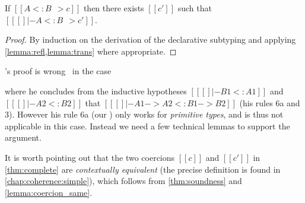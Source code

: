 \begin{theorem} \label{thm:complete}
  If $[[A <: B ~~> c]]$ then there exists $[[c']]$ such that $[[ [] |- A <: B ~~> c']]$.
\end{theorem}
\begin{proof}
  By induction on the derivation of the declarative subtyping and applying \cref{lemma:refl,lemma:trans} where appropriate.
\end{proof}
\begin{remark}
  \citeauthor{pierce1989decision}'s proof is wrong~\cite[pp.~20, Case~F]{pierce1989decision} in the case
  \begin{mathpar}
  \end{mathpar}
  where he concludes from the inductive
  hypotheses $[[ [] |- B1 <: A1]]$ and $[[ [] |- A2 <: B2]]$ that $[[ [] |- A1 -> A2 <: B1 -> B2]]$ (his rules 6a and 3).
  However his rule 6a (our ) only works for \emph{primitive types}, and is thus not applicable in this case. Instead we
  need a few technical lemmas to support the argument.
\end{remark}

\begin{remark}
  It is worth pointing out that the two coercions $[[c]]$ and $[[c']]$ in
  \cref{thm:complete} are \emph{contextually equivalent} (the precise
  definition is found in \cref{chap:coherence:simple}), which follows from
  \cref{thm:soundness} and \cref{lemma:coercion_same}.
\end{remark}

